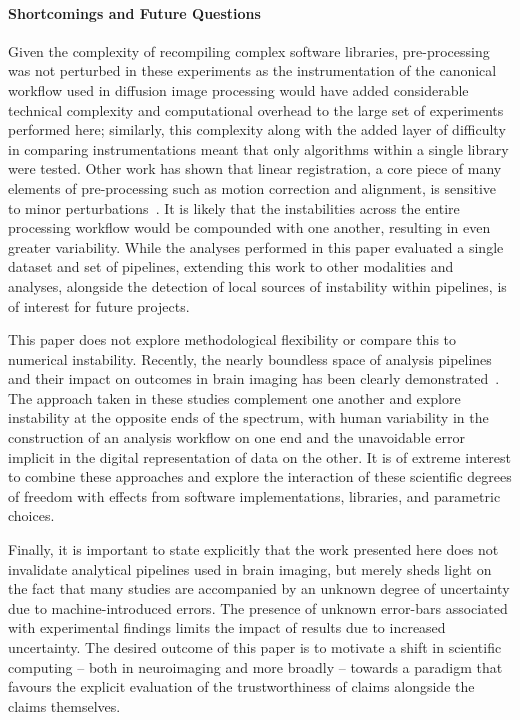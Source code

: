 \documentclass[10pt,letterpaper]{article}
\begin{document}
\paragraph{Shortcomings and Future Questions}
Given the complexity of recompiling complex software libraries, pre-processing was not 
perturbed in these experiments as the instrumentation of the canonical workflow used
in diffusion image processing would have added considerable technical complexity and
computational overhead to the large set of experiments performed here; similarly, this
complexity along with the added layer of difficulty in comparing instrumentations
meant that only algorithms within a single library were tested. Other work has shown
that linear registration, a core piece of many elements of pre-processing such as
motion correction and alignment, is sensitive to minor
perturbations~\cite{Glatard2015-vc}. It is likely that the instabilities across the
entire processing workflow would be compounded with one another, resulting in even
greater variability. While the analyses performed in this paper evaluated a single
dataset and set of pipelines, extending this work to other modalities and analyses,
alongside the detection of local sources of instability within pipelines, is of
interest for future projects.

This paper does not explore methodological flexibility or compare this to numerical
instability. Recently, the nearly boundless space of analysis pipelines and their
impact on outcomes in brain imaging has been clearly
demonstrated~\cite{botvinik2020variability}. The approach taken in these studies
complement one another and explore instability at the opposite ends of the spectrum,
with human variability in the construction of an analysis workflow on one end and the
unavoidable error implicit in the digital representation of data on the other. It is
of extreme interest to combine these approaches and explore the interaction of these
scientific degrees of freedom with effects from software implementations, libraries,
and parametric choices.

Finally, it is important to state explicitly that the work presented here does not
invalidate analytical pipelines used in brain imaging, but merely sheds light on the
fact that many studies are accompanied by an unknown degree of uncertainty due to
machine-introduced errors. The presence of unknown error-bars associated with
experimental findings limits the impact of results due to increased uncertainty. The
desired outcome of this paper is to motivate a shift in scientific computing – both
in neuroimaging and more broadly – towards a paradigm that favours the explicit
evaluation of the trustworthiness of claims alongside the claims themselves.
\end{document}
